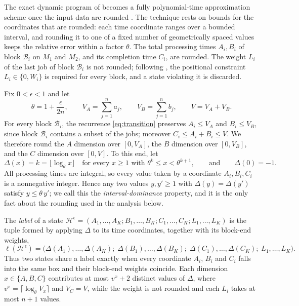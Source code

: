 ﻿\documentclass[12pt]{article}
\begin{document}
\begin{sloppypar}
The exact dynamic program of  becomes a fully polynomial-time approximation
scheme once the input data are rounded \citep{hall1994}. The technique rests on bounds for the
coordinates that are rounded: each time coordinate ranges over a bounded interval, and rounding
it to one of a fixed number of geometrically spaced values keeps the relative error within a
factor $\theta$. The total processing times $A_i,B_i$ of block $\mathcal{B}_i$ on $M_1$
and $M_2$, and its completion time $C_i$, are rounded. The weight $L_i$ of the
last job of block $\mathcal{B}_i$ is not rounded; following
, the positional constraint $L_i\in\{0,W_i\}$ is required
for every block, and a state violating it is discarded.

Fix $0<\epsilon<1$ and let
\[
\theta=1+\frac{\epsilon}{2n},\qquad
V_A=\sum_{j=1}^{n}a_j,\qquad
V_B=\sum_{j=1}^{n}b_j,\qquad
V=V_A+V_B.
\]
For every block $\mathcal{B}_i$, the recurrence \cref{eq:transition}
preserves $A_i\le V_A$ and $B_i\le V_B$, since block $\mathcal{B}_i$ contains a
subset of the jobs; moreover $C_i\le A_i+B_i\le V$. We therefore round the $A$
dimension over $[0,V_A]$, the $B$ dimension over $[0,V_B]$, and the $C$
dimension over $[0,V]$. To this end, let
\[
\Delta(x)=k=\big\lfloor\log_\theta x\big\rfloor
\quad\text{for every }x\ge 1\text{ with }\theta^{k}\le x<\theta^{k+1},
\qquad\text{and}\qquad \Delta(0)=-1 .
\]
All processing times are integral, so every value taken by a coordinate
$A_i,B_i,C_i$ is a nonnegative integer. Hence any two values $y,y'\ge1$ with
$\Delta(y)=\Delta(y')$ satisfy $y\le\theta\,y'$; we call this the
\emph{interval-dominance} property, and it is the only fact about the rounding
used in the analysis below.

The \emph{label} of a
state $\mathscr{H}^{\epsilon}=(A_1,\dots,A_K; B_1,\dots,B_K; C_1,\dots,C_K; L_1,\dots,L_K)$
is the tuple formed by applying $\Delta$ to its time coordinates, together with its block-end weights,
\[
\ell(\mathscr{H}^{\epsilon})=
\bigl(\Delta(A_1),\dots,\Delta(A_K);\;
\Delta(B_1),\dots,\Delta(B_K);\;
\Delta(C_1),\dots,\Delta(C_K);\;
L_1,\dots,L_K\bigr).
\]
Thus two states share a label exactly when every coordinate $A_i$, $B_i$ and
$C_i$ falls into the same box and their block-end weights coincide. Each dimension
$x\in\{A,B,C\}$ contributes at
most $v^{x}+2$ distinct values of $\Delta$, where
$v^{x}=\lceil\log_\theta V_x\rceil$ and $V_C=V$, while the weight is not rounded and
each $L_i$ takes at most $n+1$ values.


\end{sloppypar}
\end{document}
